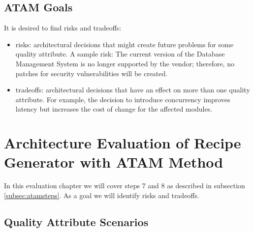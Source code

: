 \subsection{ATAM Goals}
\label{subsec:atamgoa}
It is desired to find risks and tradeoffs:
\begin{itemize}
    \item risks: architectural decisions that might create future problems for some quality attribute. A sample risk: The current version of the Database Management System is no longer supported by the vendor; therefore, no patches for security vulnerabilities will be created.
    \item tradeoffs: architectural decisions that have an effect on more than one quality attribute.     For example, the decision to introduce concurrency improves latency but increases the cost of change for the affected modules. 
\end{itemize}

\section{Architecture Evaluation of Recipe Generator with ATAM Method}
In this evaluation chapter we will cover steps 7 and 8 as described in subsection \ref{subsec:atamsteps}. As a goal we will identify risks and tradeoffs.

\subsection{Quality Attribute Scenarios}

